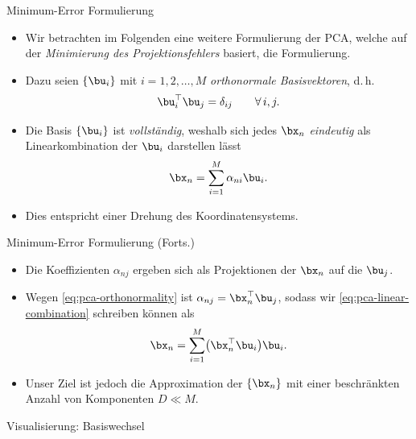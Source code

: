 \begin{frame}{Minimum-Error Formulierung}{}
	\begin{itemize}
		\item Wir betrachten im Folgenden eine weitere Formulierung der PCA, welche auf der \textit{Minimierung des Projektionsfehlers} basiert,
			die  Formulierung.
		\item Dazu seien $\{ \bu_i \}$ mit $i = 1, 2, \ldots, M$ \textit{orthonormale Basisvektoren}, d.\,h.
		\begin{equation} \label{eq:pca-orthonormality}
			\bu_i^\top \bu_j = \delta_{ij} \qquad \forall\,i, j.
		\end{equation}
		\item Die Basis $\{ \bu_i \}$ ist \textit{vollständig}, weshalb sich jedes $\bx_n$ \textit{eindeutig} als Linearkombination der $\bu_i$ darstellen lässt
		\begin{equation} \label{eq:pca-linear-combination}
			\bx_n = \sum_{i=1}^M \alpha_{ni} \bu_i.
		\end{equation}
		\item Dies entspricht einer Drehung des Koordinatensystems.
	\end{itemize}
\end{frame}


\begin{frame}{Minimum-Error Formulierung (Forts.)}{}
	\begin{itemize}
		\item Die Koeffizienten $\alpha_{nj}$ ergeben sich als Projektionen der $\bx_n$ auf die $\bu_j$.
		\item Wegen \eqref{eq:pca-orthonormality} ist $\alpha_{nj} = \bx_n^\top \bu_j$, sodass wir \eqref{eq:pca-linear-combination} schreiben
			können als
		\begin{equation} \label{eq:pca-linear-combination-2}
			\bx_n = \sum_{i=1}^M \bigl( \bx_n^\top \bu_i \bigr) \bu_i.
		\end{equation}
		\item Unser Ziel ist jedoch die Approximation der $\{ \bx_n \}$ mit einer beschränkten Anzahl von Komponenten $D \ll M$.
	\end{itemize}
\end{frame}


\begin{frame}{Visualisierung: Basiswechsel}{}

\end{frame}



